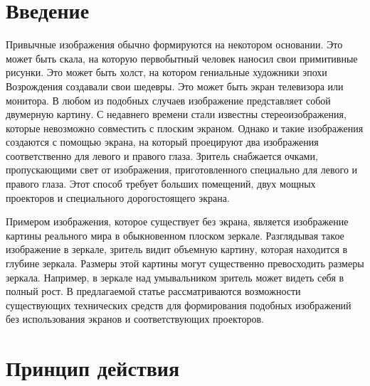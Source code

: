       \begin{multicols}{2}

      \label{st\stat}
      
   
\section{Введение}

        \vspace*{-3pt}
  
  Привычные изображения обычно формируются на некотором основании. Это может 
быть скала, на которую первобытный человек наносил свои примитивные рисунки. Это 
может быть холст, на котором гениальные художники эпохи Возрождения создавали свои 
шедевры. Это может быть экран телевизора или монитора. В любом из подобных случаев 
изображение представляет собой двумерную картину. С недавнего времени стали 
известны стереоизображения, которые невозможно совместить с плоским экраном. 
Однако и такие изображения создаются с помощью экрана, на который проецируют два 
изображения соответственно для левого и правого глаза. Зритель снабжается очками, 
пропускающими  свет от изображения, приготовленного специально для левого и правого 
глаза. Этот способ требует больших помещений, двух мощных проекторов и специального 
дорогостоящего экрана. 
  
  Примером изображения, которое существует без экрана, является изображение картины 
реального мира в обыкновенном плоском зеркале. Разглядывая такое изображение в 
зеркале, зритель видит объемную картину, которая находится в глубине зеркала. Размеры 
этой картины могут существенно превосходить размеры зеркала. Например, в зеркале над 
умывальником зритель может видеть себя в полный рост. В предлагаемой статье 
рассматриваются возможности существующих технических средств для формирования 
подобных изображений без использования экранов и соответствующих проекторов. 

        \vspace*{-6pt}

\section{Принцип действия}

        \vspace*{-3pt}


\end{multicols}
